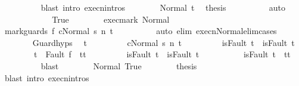 \begin{isabellebody}
\ \ \ \ \ \ \ \ \isamarkupfalse%
\ {\isacharparenleft}blast\ intro{\isacharcolon}\ execn{\isachardot}intros{\isacharparenright}\isanewline
\ \ \ \ \ \ \isamarkupfalse%
\ Normal\ t\ \isamarkupfalse%
\ {\isacharquery}thesis\isanewline
\ \ \ \ \ \ \ \ \isamarkupfalse%
\ auto\isanewline
\ \ \ \ \isamarkupfalse%
\isanewline
\ \ \ \ \ \ \isamarkupfalse%
\ True\isanewline
\ \ \ \ \ \ \isamarkupfalse%
\ exec{\isacharunderscore}mark\ Normal\ \isanewline
\ \ \ \ \ \ \isamarkupfalse%
\ {\isachardoublequoteopen}{\isasymGamma}{\isasymturnstile}{\isasymlangle}mark{\isacharunderscore}guards\ f\ c{\isacharcomma}Normal\ s{\isacharprime}{\isasymrangle}\ {\isacharequal}n{\isasymRightarrow}\ t{\isachardoublequoteclose}\isanewline
\ \ \ \ \ \ \ \ \isamarkupfalse%
\ {\isacharparenleft}auto\ elim{\isacharcolon}\ execn{\isacharunderscore}Normal{\isacharunderscore}elim{\isacharunderscore}cases{\isacharparenright}\isanewline
\ \ \ \ \ \ \isamarkupfalse%
\ Guard{\isachardot}hyps\ \isamarkupfalse%
\ t{\isacharprime}\ \isanewline
\ \ \ \ \ \ \ \ {\isachardoublequoteopen}{\isasymGamma}{\isasymturnstile}{\isasymlangle}c{\isacharcomma}Normal\ s{\isacharprime}{\isasymrangle}\ {\isacharequal}n{\isasymRightarrow}\ t{\isacharprime}{\isachardoublequoteclose}\ \isanewline
\ \ \ \ \ \ \ \ {\isachardoublequoteopen}isFault\ t\ {\isasymlongrightarrow}\ isFault\ t{\isacharprime}{\isachardoublequoteclose}\ \isanewline
\ \ \ \ \ \ \ \ {\isachardoublequoteopen}t{\isacharprime}\ {\isacharequal}\ Fault\ f\ {\isasymlongrightarrow}\ t{\isacharprime}{\isacharequal}t{\isachardoublequoteclose}\ \isanewline
\ \ \ \ \ \ \ \ {\isachardoublequoteopen}isFault\ t{\isacharprime}\ {\isasymlongrightarrow}\ isFault\ t{\isachardoublequoteclose}\ \isanewline
\ \ \ \ \ \ \ \ {\isachardoublequoteopen}{\isasymnot}\ isFault\ t{\isacharprime}\ {\isasymlongrightarrow}\ t{\isacharprime}{\isacharequal}t{\isachardoublequoteclose}\isanewline
\ \ \ \ \ \ \ \ \isamarkupfalse%
\ blast\isanewline
\ \ \ \ \ \ \isamarkupfalse%
\ Normal\ True\isanewline
\ \ \ \ \ \ \isamarkupfalse%
\ {\isacharquery}thesis\isanewline
\ \ \ \ \ \ \ \ \isamarkupfalse%
\ {\isacharparenleft}blast\ intro{\isacharcolon}\ execn{\isachardot}intros{\isacharparenright}\isanewline
\ \ \ \ \isamarkupfalse%
\isanewline
\ \ \isamarkupfalse%

\end{isabellebody}
